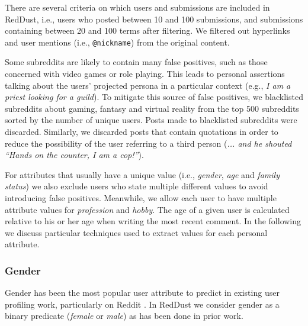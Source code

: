 There are several criteria on which users and submissions are included in RedDust, i.e., users who posted between 10 and 100 submissions, and submissions containing between 20 and 100 terms after filtering. We filtered out hyperlinks and user mentions (i.e., \texttt{\small @nickname}) from the original content.

Some subreddits are likely to contain many false positives, such as those concerned with video games or role playing. This leads to personal assertions talking about the users' projected persona in a particular context (e.g., \textit{I am a priest looking for a guild}). To mitigate this source of false positives, we blacklisted subreddits about gaming, fantasy and virtual reality from the top 500 subreddits sorted by the number of unique users. Posts made to blacklisted subreddits were discarded. 
Similarly, we discarded posts that contain quotations in order to reduce the possibility of the user referring to a third person (\textit{... and he shouted ``Hands on the counter, I am a cop!''}).

For attributes that usually have a unique value (i.e., \textit{gender}, \textit{age} and \textit{family status}) we also exclude users who state multiple different values to avoid introducing false positives. Meanwhile, we allow each user to have multiple attribute values for \textit{profession} and \textit{hobby}. The age of a given user is calculated relative to his or her age when writing the most recent comment. In the following we discuss particular techniques used to extract values for each personal attribute.

\subsubsection{Gender}
Gender has been the most popular user attribute to predict in existing user profiling work, particularly on Reddit \cite{fabian2015privacy,thelwall2018she,Vasilev2018}.
In 
RedDust
we consider gender as a binary predicate (\emph{female} or \emph{male}) 
as has been done in prior work. 

